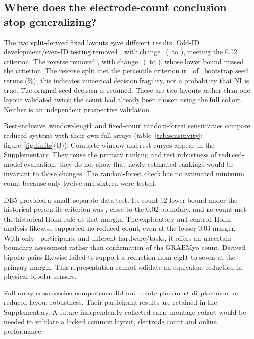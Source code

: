 \subsection{Where does the electrode-count conclusion stop generalizing?}
The two split-derived fixed layouts gave different results. Odd-ID development/even-ID testing removed \FixedDropped, with change \FixedDiff\ (\FixedLCB\ to \FixedUCB), meeting the 0.02 criterion. The reverse removed \FixedSwapDropped, with change \FixedSwapDiff\ (\FixedSwapLCBSix\ to \FixedSwapUCB), whose lower bound missed the criterion. The reverse split met the percentile criterion in \RevFixedSwapSeedHits\ of \RevFixedSwapSeedN\ bootstrap seed reruns (\RevFixedSwapSeedPercent\%); this indicates numerical decision fragility, not a probability that NI is true. The original seed decision is retained. These are two layouts rather than one layout validated twice; the count had already been chosen using the full cohort. Neither is an independent prospective validation.

Rest-inclusive, window-length and fixed-count random-forest sensitivities compare reduced systems with their own full arrays (table~\ref{tab:sensitivity}; figure~\ref{fig:limits}(B)). Complete window and rest curves appear in the Supplementary. They reuse the primary ranking and test robustness of reduced-model evaluation; they do not show that newly estimated rankings would be invariant to those changes. The random-forest check has no estimated minimum count because only twelve and sixteen were tested.

DB5 provided a small, separate-data test. Its count-12 lower bound under the historical percentile criterion was \DBFiveDeltaKTwelveLCBSix, close to the 0.02 boundary, and no count met the historical Holm rule at that margin. The exploratory null-centred Holm analysis likewise supported no reduced count, even at the looser 0.03 margin. With only \DBFiveSubjects\ participants and different hardware/tasks, it offers an uncertain boundary assessment rather than confirmation of the GRABMyo count. Derived bipolar pairs likewise failed to support a reduction from eight to seven at the primary margin. This representation cannot validate an equivalent reduction in physical bipolar sensors.

Full-array cross-session comparisons did not isolate placement displacement or reduced-layout robustness. Their participant results are retained in the Supplementary. A future independently collected same-montage cohort would be needed to validate a locked common layout, electrode count and online performance.

